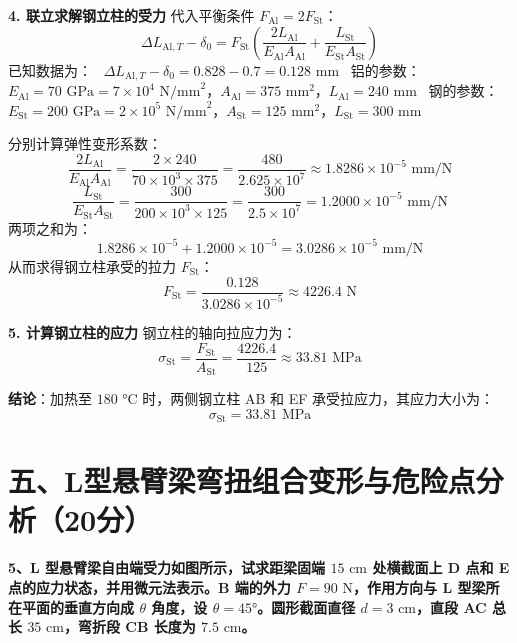 \documentclass[11pt,a4paper]{ctexrep}
\begin{document}
{\textbf{4. 联立求解钢立柱的受力}
代入平衡条件 $F_{\text{Al}} = 2 F_{\text{St}}$：
\[
    \Delta L_{\text{Al}, T} - \delta_0 = F_{\text{St}} \left( \frac{2 L_{\text{Al}}}{E_{\text{Al}} A_{\text{Al}}} + \frac{L_{\text{St}}}{E_{\text{St}} A_{\text{St}}} \right)
\]
已知数据为：
\noindent\textbullet\ $\Delta L_{\text{Al}, T} - \delta_0 = 0.828 - 0.7 = 0.128\text{ mm}$
\noindent\textbullet\ 铝的参数：$E_{\text{Al}} = 70\text{ GPa} = 7 \times 10^4\text{ N/mm}^2$，$A_{\text{Al}} = 375\text{ mm}^2$，$L_{\text{Al}} = 240\text{ mm}$
\noindent\textbullet\ 钢的参数：$E_{\text{St}} = 200\text{ GPa} = 2 \times 10^5\text{ N/mm}^2$，$A_{\text{St}} = 125\text{ mm}^2$，$L_{\text{St}} = 300\text{ mm}$

分别计算弹性变形系数：
\[
    \frac{2 L_{\text{Al}}}{E_{\text{Al}} A_{\text{Al}}} = \frac{2 \times 240}{70 \times 10^3 \times 375} = \frac{480}{2.625 \times 10^7} \approx 1.8286 \times 10^{-5}\text{ mm/N}
\]
\[
    \frac{L_{\text{St}}}{E_{\text{St}} A_{\text{St}}} = \frac{300}{200 \times 10^3 \times 125} = \frac{300}{2.5 \times 10^7} = 1.2000 \times 10^{-5}\text{ mm/N}
\]
两项之和为：
\[
    1.8286 \times 10^{-5} + 1.2000 \times 10^{-5} = 3.0286 \times 10^{-5}\text{ mm/N}
\]
从而求得钢立柱承受的拉力 $F_{\text{St}}$：
\[
    F_{\text{St}} = \frac{0.128}{3.0286 \times 10^{-5}} \approx 4226.4\text{ N}
\]

\textbf{5. 计算钢立柱的应力}
钢立柱的轴向拉应力为：
\[
    \sigma_{\text{St}} = \frac{F_{\text{St}}}{A_{\text{St}}} = \frac{4226.4}{125} \approx 33.81\text{ MPa}
\]

\textbf{结论}：加热至 $180\text{ °C}$ 时，两侧钢立柱 AB 和 EF 承受拉应力，其应力大小为：
\[
    \sigma_{\text{St}} = 33.81\text{ MPa}
\]




\section*{五、L型悬臂梁弯扭组合变形与危险点分析（20分）}

\textbf{5、L 型悬臂梁自由端受力如图所示，试求距梁固端 $15\text{ cm}$ 处横截面上 D 点和 E 点的应力状态，并用微元法表示。B 端的外力 $F=90\text{ N}$，作用方向与 L 型梁所在平面的垂直方向成 $\theta$ 角度，设 $\theta=45\text{°}$。圆形截面直径 $d = 3\text{ cm}$，直段 AC 总长 $35\text{ cm}$，弯折段 CB 长度为 $7.5\text{ cm}$。}

\begin{center}
\end{center}}
\end{document}
